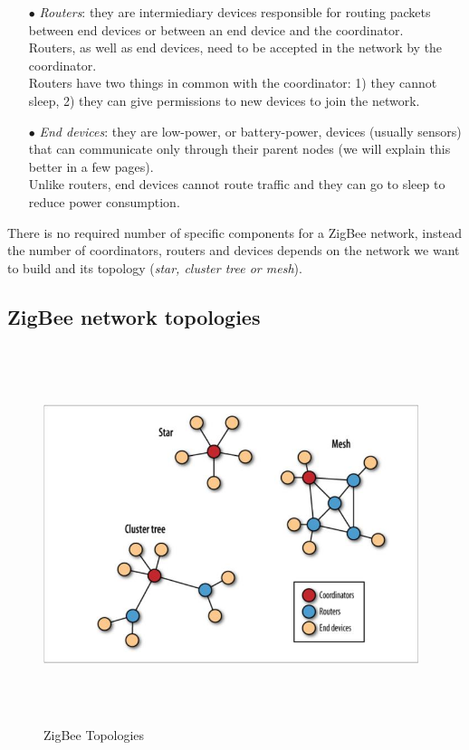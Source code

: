 \documentclass[12pt]{report}
\begin{document}
{\begin{itemize}
\item[$\bullet$] \emph{Routers}: they are intermiediary devices responsible for routing packets between end devices or between an end device and the coordinator.\\
Routers, as well as end devices, need to be accepted in the network by the coordinator.\\
Routers have two things in common with the coordinator: 1) they cannot sleep, 2) they can give permissions to new devices to join the network.

\item[$\bullet$] \emph{End devices}: they are low-power, or battery-power, devices (usually sensors) that can communicate only through their parent nodes (we will explain this better in a few pages).\\
Unlike routers, end devices cannot route traffic and they can go to sleep to reduce power consumption.
\end{itemize}

There is no required number of specific components for a ZigBee network, instead the number of coordinators, routers and devices depends on the network we want to build and its topology (\emph{star, cluster tree or mesh}).

\subsection{ZigBee network topologies}

\begin{figure}[H]
\includegraphics[width=11cm,height=11cm,keepaspectratio]{zigbee_topologies}
\centering
\caption{ZigBee Topologies}
\end{figure}

}
\end{document}
